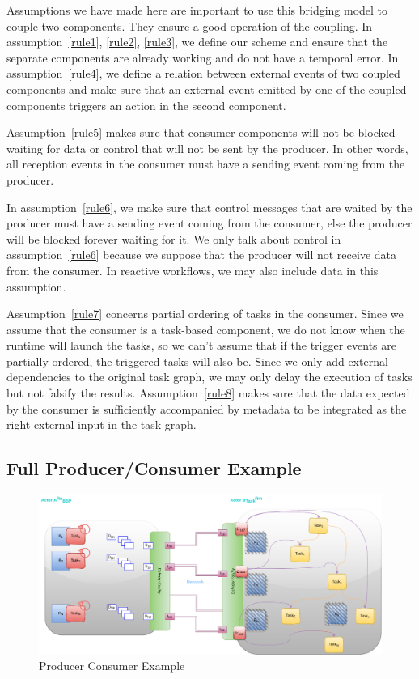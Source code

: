 Assumptions we have made here are important to use this bridging model to couple two components. They ensure a good operation of the coupling. In assumption~\ref{rule1}, \ref{rule2}, \ref{rule3}, we define our scheme and ensure that the separate components are already working and do not have a temporal error. In assumption~\ref{rule4}, we define a relation between external events of two coupled components and make sure that an external event emitted by one of the coupled components triggers an action in the second component. 

Assumption~\ref{rule5} makes sure that consumer components will not be blocked waiting for data or control that will not be sent by the producer. In other words, all reception events in the consumer must have a sending event coming from the producer. 

In assumption~\ref{rule6}, we make sure that control messages that are waited by the producer must have a sending event coming from the consumer, else the producer will be blocked forever waiting for it.  We only talk about control in assumption~\ref{rule6} because we suppose that the producer will not receive data from the consumer. In reactive workflows, we may also include data in this assumption. 

Assumption~\ref{rule7} concerns partial ordering of \deisa tasks in the consumer. Since we assume that the consumer is a task-based component, we do not know when the runtime will launch the tasks, so we can't assume that if the trigger events are partially ordered, the triggered tasks will also be. Since we only add external dependencies to the original task graph, we may only delay the execution of tasks but not falsify the results.     
Assumption~\ref{rule8} makes sure that the data expected by the consumer is sufficiently accompanied by metadata to be integrated as the right external input in the task graph.

\subsection{Full Producer/Consumer Example}\label{sec:btp:FullPCExample}
 
\begin{figure}[tb]\centering
\includegraphics[width=\columnwidth]{figures/BTP.pdf}
\caption{Producer Consumer Example}
\label{figBTP}
\end{figure}

